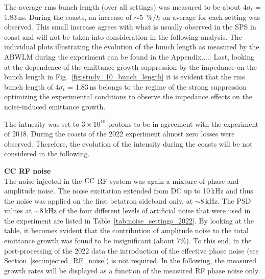 
The average rms bunch length (over all settings) was measured to be about $4\sigma_t$ = 1.83\,ns. During the coasts, an increase of $\sim$5~$\%/h$ on average for each setting was observed. This small increase agrees with what is usually observed in the SPS in coast and will not be taken into consideration in the following analysis. The individual plots illustrating the evolution of the bunch length as measured by the ABWLM during the experiment can be found in the Appendix..... Last, looking at the dependence of the emittance growth suppression by the impedance on the bunch length in Fig.~\ref{fig:study_10_bunch_length} it is evident that the rms bunch length of $4\sigma_t$ = 1.83\,ns belongs to the regime of the strong suppression optimizing the experimental conditions to observe the impedance effects on the noise-induced emittance growth.

The intnesity was set to $3 \times 10^{10}$ protons to be in agreement with the experiment of 2018. During the coasts of the 2022 experiment almost zero losses were observed. Therefore, the evolution of the intensity during the coasts will be not considered in the following.


\textbf{CC RF noise}\\
The noise injected in the ${\mathrm{CC}}$ RF system was again a mixture of phase and amplitude noise. The noise excitation extended from DC up to 10\,kHz and thus the noise was applied on the first betatron sideband only, at $\sim$8\,kHz. The PSD values at $\sim$8\,kHz of the four different levels of artificial noise that were used in the experiment are listed in Table~\ref{tab:noise_settings_2022}. By looking at the table, it becomes evident that the contribution of amplitude noise to the total emittance growth was found to be insignificant (about 7$\%$). To this end, in the post-processing of the 2022 data the introduction of the effective phase noise (see Section~\ref{sec:injected_RF_noise}) is not required. In the following, the measured growth rates will be displayed as a function of the measured RF phase noise only.



